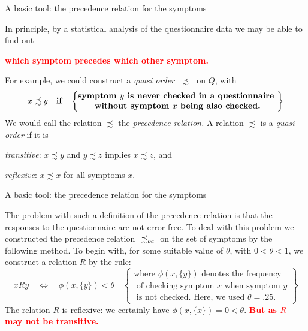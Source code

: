 \documentclass{beamer}
\def\tl{\vskip 2mm}
\def\wl{\vskip 4mm}
\def\itbul{\item[$\bullet$]}
\def\hh{\theta}
\def\EQ{\Longleftrightarrow}
\def\pha{\phantom}
\def\rtxt#1{\textcolor{red}{#1}}
\def\pOC{\precsim_{\tiny oc}}
\begin{document}
\begin{frame}{A basic tool: the precedence relation for  the symptoms}
\center
\begin{minipage}{11cm} In principle, by a statistical analysis of the questionnaire data we may be able to find out    
\tl
\centerline{\rtxt{\bf which symptom precedes which other symptom.}}
\tl
For example, we could construct a {\sl quasi order}\,\, $\precsim$\,\, on $Q$, with
$$
x\precsim y \quad\text{\bf if}\quad\left\{\begin{matrix}\text{\bf symptom $y$ is never checked in a questionnaire }\\
\text{\bf without  symptom $x$ being also checked.}\end{matrix}\right\}
$$
We would call the relation $\precsim$ the {\sl precedence relation.}
\tl
A relation $\precsim$ is a {\sl quasi order} if it is
\begin{roster}
\itbul  {\sl transitive}: $x\precsim y$ and $y\precsim z$ implies $x\precsim z$, and 
\itbul {\sl reflexive}: $x\precsim x$ for all symptoms $x$.
\end{roster}

\end{minipage}
\pha{x}


 \vspace{.5cm}



\end{frame}
\begin{frame}{A basic tool: the precedence relation for  the symptoms}
\center
\begin{minipage}{11cm} 
The problem with such a definition of the precedence relation is that the responses to the questionnaire are not error free.
\wl
 To deal with this problem we constructed the precedence relation  \,\,$\pOC$\,\, on the set of symptoms by the following method. To begin with, for some suitable value of $\hh$, with $0<\hh<1$, we  construct a relation $R$ by the  rule:
$$
xR y \quad\EQ\quad \phi(x,\{y\}) <\hh\quad\left\{\begin{smallmatrix}\text{where $\phi(x,\{y\})$ denotes the frequency}
\\ \text{ of   checking symptom $x$ when symptom $y$}\\
\text{ is not checked. Here, we used $\hh =.25$.}
\end{smallmatrix}\right\} 
$$
The relation $R$ is reflexive: we certainly have $\phi(x,\{x\})=0 <\hh$. 
\tl
\rtxt{\bf But as $R$ may not be transitive.}
\end{minipage}



\pha{x}

 \vspace{.5cm}


\end{frame}
\end{document}
